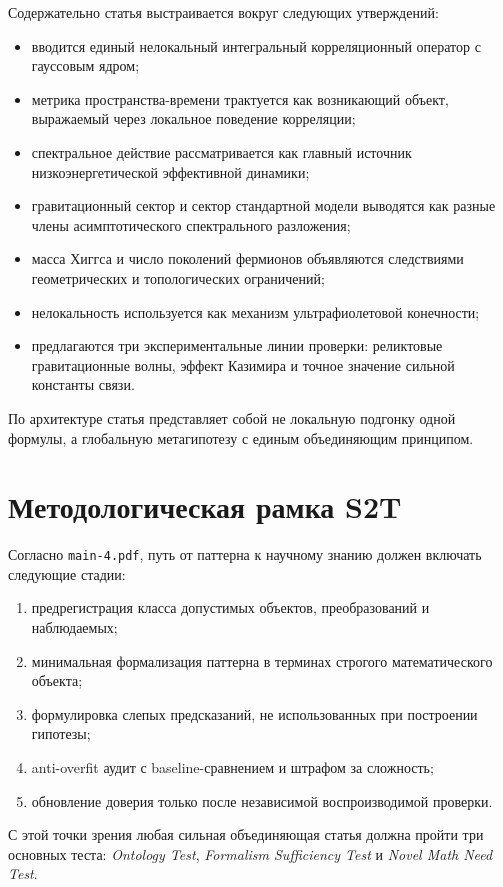 \documentclass[12pt,a4paper]{article}
\begin{document}
Содержательно статья выстраивается вокруг следующих утверждений:
\begin{itemize}
    \item вводится единый нелокальный интегральный корреляционный оператор с гауссовым ядром;
    \item метрика пространства-времени трактуется как возникающий объект, выражаемый через локальное поведение корреляции;
    \item спектральное действие рассматривается как главный источник низкоэнергетической эффективной динамики;
    \item гравитационный сектор и сектор стандартной модели выводятся как разные члены асимптотического спектрального разложения;
    \item масса Хиггса и число поколений фермионов объявляются следствиями геометрических и топологических ограничений;
    \item нелокальность используется как механизм ультрафиолетовой конечности;
    \item предлагаются три экспериментальные линии проверки: реликтовые гравитационные волны, эффект Казимира и точное значение сильной константы связи.
\end{itemize}

По архитектуре статья представляет собой не локальную подгонку одной формулы, а глобальную метагипотезу с единым объединяющим принципом.

\section{Методологическая рамка S2T}

Согласно \texttt{main-4.pdf}, путь от паттерна к научному знанию должен включать следующие стадии:
\begin{enumerate}
    \item предрегистрация класса допустимых объектов, преобразований и наблюдаемых;
    \item минимальная формализация паттерна в терминах строгого математического объекта;
    \item формулировка слепых предсказаний, не использованных при построении гипотезы;
    \item anti-overfit аудит с baseline-сравнением и штрафом за сложность;
    \item обновление доверия только после независимой воспроизводимой проверки.
\end{enumerate}

С этой точки зрения любая сильная объединяющая статья должна пройти три основных теста: \emph{Ontology Test}, \emph{Formalism Sufficiency Test} и \emph{Novel Math Need Test}.
\end{document}
